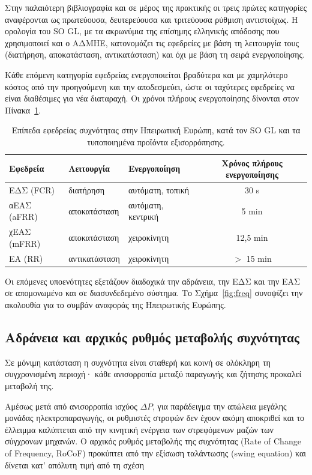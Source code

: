 Στην παλαιότερη βιβλιογραφία και σε μέρος της πρακτικής οι τρεις πρώτες κατηγορίες
αναφέρονται ως πρωτεύουσα, δευτερεύουσα και τριτεύουσα ρύθμιση αντιστοίχως. Η ορολογία του
SO GL, με τα ακρωνύμια της επίσημης ελληνικής απόδοσης που χρησιμοποιεί και ο ΑΔΜΗΕ,
κατονομάζει τις εφεδρείες με βάση τη λειτουργία τους (διατήρηση, αποκατάσταση,
αντικατάσταση) και όχι με βάση τη σειρά ενεργοποίησης.

Κάθε επόμενη κατηγορία εφεδρείας ενεργοποιείται βραδύτερα και με χαμηλότερο κόστος από την
προηγούμενη και την αποδεσμεύει, ώστε οι ταχύτερες εφεδρείες να είναι διαθέσιμες για νέα
διαταραχή. Οι χρόνοι πλήρους ενεργοποίησης δίνονται στον Πίνακα~\ref{tab:reserves}.

\begin{table}[!htbp]
\centering
\begin{tabular}{lllc}
\hline
Εφεδρεία & Λειτουργία & Ενεργοποίηση & Χρόνος πλήρους ενεργοποίησης \\
\hline
ΕΔΣ (FCR)   & διατήρηση      & αυτόματη, τοπική   & 30 s \\
αΕΑΣ (aFRR) & αποκατάσταση   & αυτόματη, κεντρική & 5 min \\
χΕΑΣ (mFRR) & αποκατάσταση   & χειροκίνητη        & 12,5 min \\
ΕΑ (RR)     & αντικατάσταση  & χειροκίνητη        & $>$ 15 min \\
\hline
\end{tabular}
\caption{Επίπεδα εφεδρείας συχνότητας στην Ηπειρωτική Ευρώπη, κατά τον SO GL και τα
τυποποιημένα προϊόντα εξισορρόπησης.}
\label{tab:reserves}
\end{table}

Οι επόμενες υποενότητες εξετάζουν διαδοχικά την αδράνεια, την ΕΔΣ και την ΕΑΣ σε απομονωμένο
και σε διασυνδεδεμένο σύστημα. Το Σχήμα~\ref{fig:freq} συνοψίζει την ακολουθία για το συμβάν
αναφοράς της Ηπειρωτικής Ευρώπης.

\subsection{Αδράνεια και αρχικός ρυθμός μεταβολής συχνότητας}

Σε μόνιμη κατάσταση η συχνότητα είναι σταθερή και κοινή σε ολόκληρη τη συγχρονισμένη
περιοχή· κάθε ανισορροπία μεταξύ παραγωγής και ζήτησης προκαλεί μεταβολή της.

Αμέσως μετά από ανισορροπία ισχύος $\Delta P$, για παράδειγμα την απώλεια μεγάλης μονάδας
ηλεκτροπαραγωγής, οι ρυθμιστές στροφών δεν έχουν ακόμη αποκριθεί και το έλλειμμα καλύπτεται
από την κινητική ενέργεια των στρεφόμενων μαζών των σύγχρονων μηχανών. Ο αρχικός ρυθμός
μεταβολής της συχνότητας (Rate of Change of Frequency, RoCoF) προκύπτει από την εξίσωση
ταλάντωσης (swing equation) και δίνεται κατ' απόλυτη τιμή από τη σχέση

